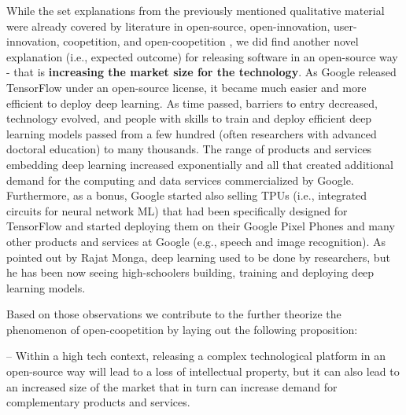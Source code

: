 \documentclass[CHICAGO,Times1COL]{WileyNJDv5} %
\begin{document}
While the set explanations from the previously mentioned qualitative material were already covered by literature in open-source, open-innovation, user-innovation, coopetition, and open-coopetition \citep[see~e.g.,][]{von2005democratizing,RoyChesbrough_et_al2018,BengtssonKock2014,teixeira2023icis}, we did find another novel explanation (i.e., expected outcome) for releasing software in an open-source way - that is \textbf{increasing the market size for the technology}. As Google released TensorFlow under an open-source license, it became much easier and more efficient to deploy deep learning. As time passed, barriers to entry decreased, technology evolved, and people with skills to train and deploy efficient deep learning models passed from a few hundred (often researchers with advanced doctoral education) to many thousands. The range of products and services embedding deep learning increased exponentially and all that created additional demand for the computing and data services commercialized by Google. Furthermore, as a bonus, Google started also selling TPUs (i.e., integrated circuits for neural network \ac{ML}) that had been specifically designed for TensorFlow and started deploying them on their Google Pixel Phones and many other products and services at Google (e.g., speech and image recognition). As pointed out by Rajat Monga, deep learning used to be done by researchers, but he has been now seeing high-schoolers building, training and deploying deep learning models. 


Based on those observations we contribute to the further theorize the phenomenon of open-coopetition by laying out the following proposition:

\begin{theoreticalproposition}
\label{onTI}
-- Within a high tech context, releasing a complex technological platform in an open-source way will lead to a loss of intellectual property, but it can also lead to an increased size of the market that in turn can increase demand for complementary products and services. 
\end{theoreticalproposition}
\end{document}
